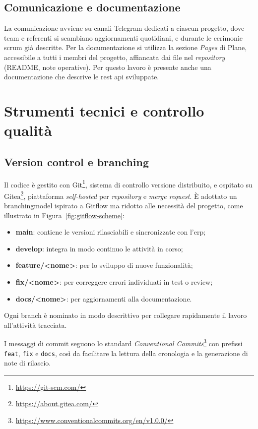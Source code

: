 \subsection{Comunicazione e documentazione}
La comunicazione avviene su canali Telegram dedicati a ciascun progetto, dove team e referenti si scambiano aggiornamenti quotidiani, e durante le cerimonie \gls{scrum} già descritte. Per la documentazione si utilizza la sezione \textit{Pages} di Plane, accessibile a tutti i membri del progetto, affiancata dai file nel \textit{repository} (README, note operative). Per questo lavoro è presente anche una documentazione che descrive le \gls{rest} \gls{api} sviluppate.

\section{Strumenti tecnici e controllo qualità}

\subsection{Version control e branching}
Il codice è gestito con Git\footnote{\url{https://git-scm.com/}}, sistema di controllo versione distribuito, e ospitato su Gitea\footnote{\url{https://about.gitea.com/}}, piattaforma \textit{self-hosted} per \textit{repository} e \textit{merge request}. È adottato un \gls{branchingmodel} ispirato a Gitflow ma ridotto alle necessità del progetto, come illustrato in Figura~\ref{fig:gitflow-scheme}:
\begin{itemize}
    \item \textbf{main}: contiene le versioni rilasciabili e sincronizzate con l’\acrshort{erp};
    \item \textbf{develop}: integra in modo continuo le attività in corso;
    \item \textbf{feature/<nome>}: per lo sviluppo di nuove funzionalità;
    \item \textbf{fix/<nome>}: per correggere errori individuati in test o review;
    \item \textbf{docs/<nome>}: per aggiornamenti alla documentazione.
\end{itemize}
Ogni branch è nominato in modo descrittivo per collegare rapidamente il lavoro all’attività tracciata.

I messaggi di commit seguono lo standard \textit{Conventional Commits}\footnote{\url{https://www.conventionalcommits.org/en/v1.0.0/}} con prefissi \texttt{feat}, \texttt{fix} e \texttt{docs}, così da facilitare la lettura della cronologia e la generazione di note di rilascio.

